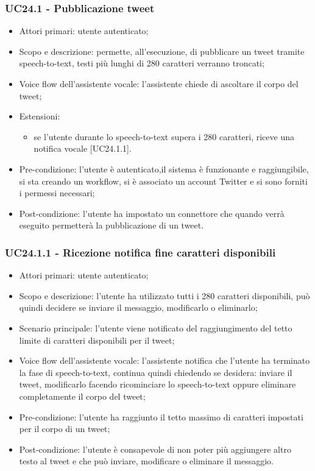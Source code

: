 \subsubsection{UC24.1 - Pubblicazione tweet}
\begin{itemize}
	\item  Attori primari: utente autenticato;
	\item  Scopo e descrizione: permette, all'esecuzione, di pubblicare un tweet tramite speech-to-text, testi più lunghi di 280 caratteri verranno troncati;
	\item  Voice flow dell'assistente vocale: l'assistente chiede di ascoltare il corpo del tweet;
	\item  Estensioni: 
		   \begin{itemize}
				\item se l'utente durante lo speech-to-text supera i 280 caratteri, riceve una notifica vocale [UC24.1.1].
		   \end{itemize}
	\item  Pre-condizione: l'utente è autenticato,il sistema è funzionante e raggiungibile, si sta creando un workflow, si è associato un account Twitter e si sono forniti i permessi necessari;
	\item  Post-condizione: l'utente ha impostato un connettore che quando verrà eseguito permetterà la pubblicazione di un tweet.
\end{itemize}
\subsubsection{UC24.1.1 - Ricezione notifica fine caratteri disponibili}
\begin{itemize}
	\item  Attori primari: utente autenticato;
	\item  Scopo e descrizione: l'utente ha utilizzato tutti i 280 caratteri disponibili, può quindi decidere se inviare il messaggio, modificarlo o eliminarlo;
	\item  Scenario principale: l'utente viene notificato del raggiungimento del tetto limite di caratteri disponibili per il tweet;
	\item  Voice flow dell'assistente vocale: l'assistente notifica che l'utente ha terminato la fase di speech-to-text, continua quindi chiedendo se desidera: inviare il tweet, modificarlo facendo ricominciare lo speech-to-text oppure eliminare completamente il corpo del tweet;
	\item  Pre-condizione: l'utente ha raggiunto il tetto massimo di caratteri impostati per il corpo di un tweet;
	\item  Post-condizione: l'utente è consapevole di non poter più aggiungere altro testo al tweet e che può inviare, modificare o eliminare il messaggio.
\end{itemize}
